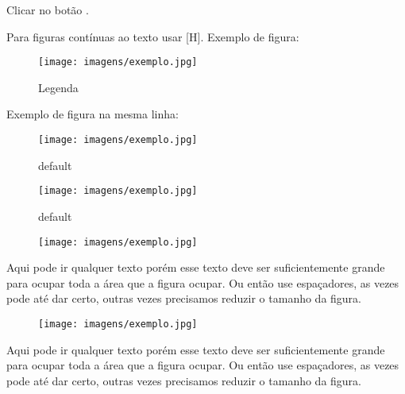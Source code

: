 \documentclass[a4paper,11pt]{article}
\begin{document}
Clicar no botão .

Para figuras contínuas ao texto usar [H]. Exemplo de figura:
\begin{figure}[H]
	\centering
	\texttt{[image: imagens/exemplo.jpg]}
	\caption{Legenda}
\end{figure}

Exemplo de figura na mesma linha:

\begin{figure}[ht]
	\begin{minipage}[b]{0.45\linewidth}
		\centering
		\texttt{[image: imagens/exemplo.jpg]}
		\caption{default}
		\label{fig:figure1}
	\end{minipage}
	\hspace{0.5cm}
	\begin{minipage}[b]{0.45\linewidth}
		\centering
		\texttt{[image: imagens/exemplo.jpg]}
		\caption{default}
		\label{fig:figure2}
	\end{minipage}
\end{figure}

\begin{minipage}{\textwidth}
	\vspace{5pt}
	\begin{wrapfigure}{l}{0.15\textwidth}
		\vspace{-\baselineskip}
		\texttt{[image: imagens/exemplo.jpg]} 
	\end{wrapfigure}
	Aqui pode ir qualquer texto porém esse texto deve ser suficientemente grande para ocupar toda a área que a figura ocupar. Ou então use espaçadores, as vezes pode até dar certo, outras vezes precisamos reduzir o tamanho da figura.
\end{minipage}

\begin{minipage}{\textwidth}
	\vspace{5pt}
	\begin{wrapfigure}{t}{0.15\textwidth}
		\vspace{-\baselineskip}
		\texttt{[image: imagens/exemplo.jpg]} 
	\end{wrapfigure}
	Aqui pode ir qualquer texto porém esse texto deve ser suficientemente grande para ocupar toda a área que a figura ocupar. Ou então use espaçadores, as vezes pode até dar certo, outras vezes precisamos reduzir o tamanho da figura. \\[3mm]
\end{minipage}
\end{document}
